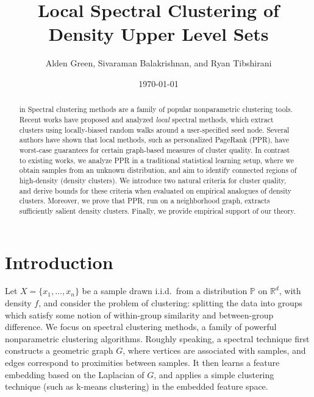 \documentclass{article}
\newcommand{\Reals}{\mathbb{R}}
\newcommand{\Rd}{\Reals^d}
\newcommand{\1}{\mathbf{1}}
\newcommand{\Xbf}{X}             %
\newcommand{\Pbb}{\mathbb{P}}
\theoremstyle{aldenthm}
\theoremstyle{aldenrmrk}
\begin{document}
\title{Local Spectral Clustering of Density Upper Level Sets}
\author{Alden Green, Sivaraman Balakrishnan, and Ryan Tibshirani}
\date{\today}
\maketitle

\begin{abstract}
 in %
Spectral clustering methods are a family of popular nonparametric clustering
tools.  Recent works have proposed and analyzed \emph{local} spectral methods,
which extract clusters using locally-biased random walks around a user-specified
seed node.  Several authors have shown that local methods, such as personalized
PageRank (PPR), have worst-case guarantees for certain graph-based measures of
cluster quality.  In contrast to existing works, we analyze PPR in a traditional
statistical learning setup, where we obtain samples from an unknown
distribution, and aim to identify connected regions of high-density (density
clusters).  We introduce two natural criteria for cluster quality, and derive
bounds for these criteria when evaluated on empirical analogues of density
clusters. Moreover, we prove that PPR, run on a neighborhood graph, extracts
sufficiently salient density clusters. Finally, we provide empirical support of our theory.
\end{abstract}

\section{Introduction}
\label{sec: introduction}

Let $\Xbf = \{x_1, \ldots, x_n\}$ be a sample drawn i.i.d.\ from a
distribution $\Pbb$ on $\Rd$, with density $f$, and consider the problem of 
clustering: splitting the data into groups which satisfy some notion of
within-group similarity and between-group difference.  We focus on spectral
clustering methods, a family of powerful nonparametric clustering algorithms.
Roughly speaking, a spectral technique first constructs a geometric graph $G$,
where vertices are associated with samples, and edges correspond to proximities
between samples. It then learns a feature embedding based on the Laplacian of
$G$, and applies a simple clustering technique (such as k-means clustering) in
the embedded feature space.
\end{document}
